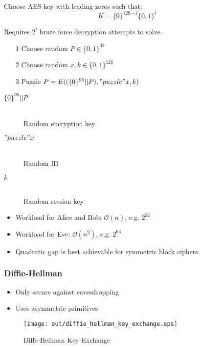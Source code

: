 \documentclass[a4paper]{article}
\begin{document}
Choose AES key with leading zeros such that:
\[K = \{0\}^{128-l} \{0,1\}^{l}\]

Requires $2^{l}$ brute force decryption attempts to solve.


\begin{enumerate}
  \item[1] Choose random $P \in \{0,1\}^{32}$
  \item[2] Choose random $x, k \in \{0,1\}^{128}$
  \item[3] Puzzle $P = E((\{0\}^{96}||P), "puzzle" x, k)$
\end{enumerate}


\begin{description}
  \item[$\{0\}^{96} || P$] \hfill \\
    Random encryption key
  \item[$"puzzle" x$] \hfill \\
    Random ID
  \item[$k$] \hfill \\
    Random session key
\end{description}


\begin{itemize}
  \item Workload for Alice and Bob: $\mathcal{O}(n)$, e.g. $2^{32}$
  \item Workload for Eve: $\mathcal{O}(n^{2})$, e.g. $2^{64}$
  \item Quadratic gap is best achievable for symmetric block ciphers
\end{itemize}

\subsubsection{Diffie-Hellman}

\begin{itemize}
  \item Only secure against eavesdropping
  \item Uses asymmetric primitives
\end{itemize}

\begin{figure}[h!]
  \centering
  \texttt{[image: out/diffie\_hellman\_key\_exchange.eps]}
  \caption{Diffe-Hellman Key Exchange}
  \label{fig:diffe_hellman_key_exchange}
\end{figure}
\FloatBarrier
\end{document}

